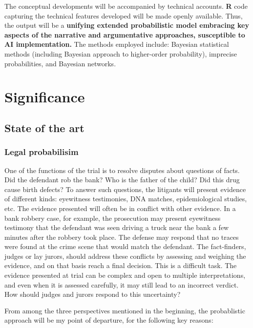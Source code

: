 \documentclass[11pt,dvipsnames,enabledeprecatedfontcommands]{scrartcl}
\begin{document}
The conceptual developments will be accompanied by technical accounts.
\textbf{\textsf{R}} code capturing the technical features developed will
be made openly available. Thus, the output will be a
\textbf{unifying extended probabilistic model embracing key aspects of the narrative and argumentative approaches, susceptible to AI implementation.}
The methods employed include: Bayesian statistical methods (including
Bayesian approach to higher-order probability), imprecise probabilities,
and Bayesian networks.

\section{Significance}\label{significance}

\subsection{State of the art}\label{state-of-the-art}

\subsubsection{Legal probabilisim}\label{legal-probabilisim}

One of the functions of the trial is to resolve disputes about questions
of facts. Did the defendant rob the bank? Who is the father of the
child? Did this drug cause birth defects? To answer such questions, the
litigants will present evidence of different kinds: eyewitness
testimonies, DNA matches, epidemiological studies, etc. The evidence
presented will often be in conflict with other evidence. In a bank
robbery case, for example, the prosecution may present eyewitness
testimony that the defendant was seen driving a truck near the bank a
few minutes after the robbery took place. The defense may respond that
no traces were found at the crime scene that would match the defendant.
The fact-finders, judges or lay jurors, should address these conflicts
by assessing and weighing the evidence, and on that basis reach a final
decision. This is a difficult task. The evidence presented at trial can
be complex and open to multiple interpretations, and even when it is
assessed carefully, it may still lead to an incorrect verdict. How
should judges and jurors respond to this uncertainty?

From among the three perspectives mentioned in the beginning, the
probablistic approach will be my point of departure, for the following
key reasons:
\end{document}
